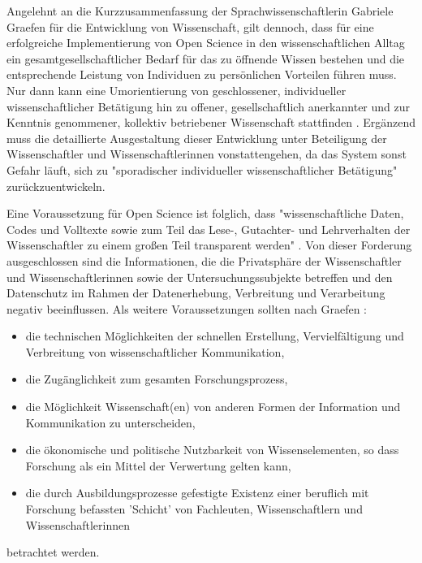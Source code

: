 Angelehnt an die Kurzzusammenfassung der Sprachwissenschaftlerin Gabriele Graefen für die Entwicklung von Wissenschaft, gilt dennoch, dass für eine erfolgreiche Implementierung von Open Science in den wissenschaftlichen Alltag ein gesamtgesellschaftlicher Bedarf für das zu öffnende Wissen bestehen und die entsprechende Leistung von Individuen zu persönlichen Vorteilen führen muss. Nur dann kann eine Umorientierung von geschlossener, individueller wissenschaftlicher Betätigung hin zu offener, gesellschaftlich anerkannter und zur Kenntnis genommener, kollektiv betriebener Wissenschaft stattfinden \cite{Graefen_2007}. Ergänzend muss die detaillierte Ausgestaltung dieser Entwicklung unter Beteiligung der Wissenschaftler und Wissenschaftlerinnen vonstattengehen, da das System sonst Gefahr läuft, sich zu "sporadischer individueller wissenschaftlicher Betätigung" \cite{Graefen_2007} zu­rück­zuent­wi­ckeln.

Eine Voraussetzung für Open Science ist folglich, dass "wissenschaftliche Daten, Codes und Volltexte sowie zum Teil das Lese-, Gutachter- und Lehrverhalten der Wissenschaftler zu einem großen Teil transparent werden" \cite{Brembs_2015}. Von dieser Forderung ausgeschlossen sind die Informationen, die die Privatsphäre der Wissenschaftler und Wissenschaftlerinnen sowie der Untersuchungssubjekte betreffen und den Datenschutz im Rahmen der Datenerhebung, Verbreitung und Verarbeitung negativ beeinflussen. Als weitere Voraussetzungen sollten nach Graefen \cite{Graefen_2007}:
\begin{itemize}
\item die technischen Möglichkeiten der schnellen Erstellung, Vervielfältigung und Verbreitung von wissenschaftlicher Kommunikation,
\item die Zugänglichkeit zum gesamten Forschungsprozess,
\item die Möglichkeit Wissenschaft(en) von anderen Formen der Information und Kommunikation zu unterscheiden,
\item die ökonomische und politische Nutzbarkeit von Wissenselementen, so dass Forschung als ein Mittel der Verwertung gelten kann,
\item die durch Ausbildungsprozesse gefestigte Existenz einer beruflich mit Forschung befassten 'Schicht' von Fachleuten, Wissenschaftlern und Wissenschaftlerinnen
\end{itemize}
betrachtet werden.

